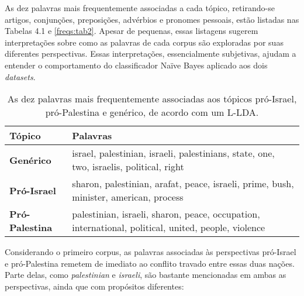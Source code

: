 
As dez palavras mais frequentemente associadas a cada tópico, retirando-se artigos, conjunções, preposições, advérbios e pronomes pessoais, estão listadas nas Tabelas 4.1 e \ref{freqs:tab2}. Apesar de pequenas, essas listagens sugerem interpretações sobre como as palavras de cada corpus são exploradas por suas diferentes perspectivas. Essas interpretações, essencialmente  subjetivas, ajudam a entender o comportamento do classificador Naïve Bayes aplicado aos dois \emph{datasets}.%




\begin{table}[h]
\label{tab1}
\centering
\begin{tabular}{| l | p{10cm} | }
\hline
\textbf{Tópico} & \textbf{Palavras} \\ \hline
\textbf{Genérico} & israel, palestinian, israeli, palestinians, state, one, two, israelis, political, right \\ \hline
\textbf{Pró-Israel} & sharon, palestinian, arafat, peace, israeli, prime, bush, minister, american, process \\ \hline
\textbf{Pró-Palestina} & palestinian, israeli, sharon, peace, occupation, international, political, united, people, violence \\ \hline
\end{tabular}
\caption{As dez palavras mais frequentemente associadas aos tópicos pró-Israel, pró-Palestina e genérico, de acordo com um L-LDA.}
\end{table}


Considerando o primeiro corpus, as palavras associadas às perspectivas pró-Israel e pró-Palestina remetem de imediato ao conflito travado entre essas duas nações. Parte delas, como \emph{palestinian} e \emph{israeli}, são bastante mencionadas em ambas as perspectivas, ainda que com propósitos diferentes: %

